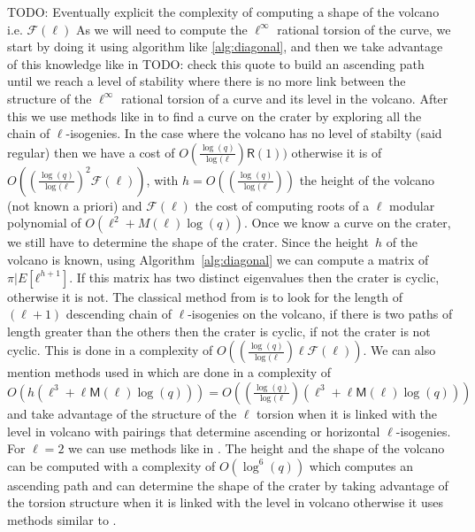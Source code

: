 \documentclass{lms}
\newcommand{\todo}[1]{{\color{red}TODO: #1}}
\begin{document}
\todo{Eventually explicit the complexity of computing a shape of the volcano i.e. $\mathcal{F}(\ell)$}
As we will need to compute the $\ell^{\infty}$ rational torsion of the curve, we start by doing it using algorithm like \ref{alg:diagonal}, and then we take advantage of this knowledge like in \cite{MireMRV05} \todo{check this quote} to build an ascending path until we reach a level of stability where there is no more link between the structure of the $\ell^{\infty}$ rational torsion of a curve and its level in the volcano. After this we use methods like in \cite{volcano} to find a curve on the crater by exploring all the chain of $\ell$-isogenies. In the case where the volcano has no level of stabilty (said regular) then we have a cost of $O(\frac{\log(q)}{\log(\ell}) \mathsf{R}(1) )$ otherwise it is of  $O( ( \frac{\log(q)}{\log(\ell})^2 \mathcal{F}(\ell) )$, with $h=O(( \frac{\log(q)}{\log(\ell}))$ the height of the volcano (not known a priori) and $\mathcal{F}(\ell)$ the cost of computing roots of a $\ell$ modular polynomial of $O(\ell^2+M(\ell)\log(q))$. 
\newline
Once we know a curve on the crater,
we still have to determine the shape of the crater.
Since the height~$h$ of the volcano is known,
using Algorithm~\ref{alg:diagonal} we can compute a matrix of $π|E[ℓ^{h+1}]$.
If this matrix has two distinct eigenvalues then the crater is cyclic,
otherwise it is not.
The classical method from \cite{volcano} is to look for  the length of $(\ell+1)$ descending chain of $\ell$-isogenies on the volcano, if there is two paths of length greater than the others then the crater is cyclic, if not the crater is not cyclic. This is done in a complexity of $O( ( \frac{\log(q)}{\log(\ell})\ell \mathcal{F}(\ell) )$. We can also mention methods used in \cite{IonicaJ10} which are done in a complexity of $O(h(\ell^3+\ell \mathsf{M}(\ell) \log(q)))=O(( \frac{\log(q)}{\log(\ell})(\ell^3+\ell \mathsf{M}(\ell) \log(q)))$ and take advantage of the structure of the $\ell$ torsion when it is linked with the level in volcano with pairings that determine ascending or horizontal $\ell$-isogenies. %
\newline 
For $\ell=2$ we can use methods like in \cite{MiretMRV05}. The height and the shape of the volcano can be computed with a complexity of $O(\log^6(q))$ which computes an ascending path and can determine the shape of the crater by taking advantage of the torsion structure when it is linked with the level in volcano otherwise it uses methods similar to \cite{volcano}.
\end{document}
